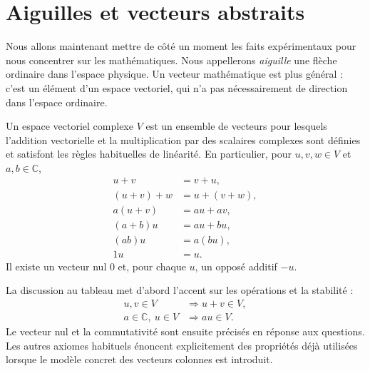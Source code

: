 \begin{classroomqa}
\end{classroomqa}

\section{Aiguilles et vecteurs abstraits}

Nous allons maintenant mettre de côté un moment les faits expérimentaux pour nous concentrer sur les mathématiques. Nous appellerons \emph{aiguille} une flèche ordinaire dans l’espace physique. Un vecteur mathématique est plus général : c’est un élément d’un espace vectoriel, qui n’a pas nécessairement de direction dans l’espace ordinaire.

\begin{definition}
Un espace vectoriel complexe \(V\) est un ensemble de vecteurs pour lesquels l’addition vectorielle et la multiplication par des scalaires complexes sont définies et satisfont les règles habituelles de linéarité. En particulier, pour \(u,v,w\in V\) et \(a,b\in\mathbb C\),
\begin{align}
  u+v&=v+u,\\
  (u+v)+w&=u+(v+w),\\
  a(u+v)&=au+av,\\
  (a+b)u&=au+bu,\\
  (ab)u&=a(bu),\\
  1u&=u.
\end{align}
Il existe un vecteur nul \(0\) et, pour chaque \(u\), un opposé additif \(-u\).
\end{definition}

La discussion au tableau met d’abord l’accent sur les opérations et la stabilité :
\begin{equation}
\begin{aligned}
  u,v\in V&\Longrightarrow u+v\in V,\\
  a\in\mathbb C,\ u\in V&\Longrightarrow au\in V.
\end{aligned}
\end{equation}
Le vecteur nul et la commutativité sont ensuite précisés en réponse aux questions. Les autres axiomes habituels énoncent explicitement des propriétés déjà utilisées lorsque le modèle concret des vecteurs colonnes est introduit.


